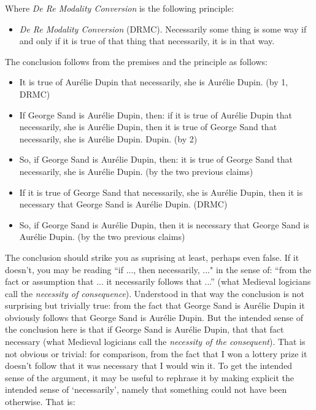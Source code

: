 \documentclass[../../../include/open-logic-chapter]{subfiles}
\begin{document}
Where \emph{De Re Modality Conversion} is the following principle:

\begin{itemize}
\item \emph{De Re Modality Conversion} (DRMC). Necessarily some thing is some way if and
only if it is true of that thing that necessarily, it is in that way. 
\end{itemize}

The conclusion follows from the premises and the principle as follows:

\begin{itemize}
\item It is true of Aurélie Dupin that necessarily, she is Aurélie
Dupin. (by 1, DRMC)
\item If George Sand is Aurélie Dupin, then: if it is true of Aurélie 
Dupin that necessarily, she is Aurélie Dupin, then it is true of 
George Sand that necessarily, she is Aurélie Dupin.
Dupin. (by 2)
\item So, if George Sand is Aurélie Dupin, then: it is true of George Sand that necessarily, she is Aurélie Dupin. (by the two previous claims)
\item If it is true of George Sand that necessarily, she is Aurélie Dupin, then it is necessary that George Sand is Aurélie Dupin. (DRMC)
\item So, if George Sand is Aurélie Dupin, then it is necessary that George Sand is Aurélie Dupin. (by the two previous claims)
\end{itemize}

The conclusion should strike you as suprising at least, perhaps even
false. If it doesn't, you may be reading ``if ..., then necessarily,
..." in the sense of: ``from the fact or assumption that ... it
necessarily follows that ...'' (what Medieval logicians call the
\emph{necessity of consequence}). Understood in that way the
conclusion is not surprising but trivially true: from the fact that
George Sand is Aurélie Dupin it obviously follows that George Sand is
Aurélie Dupin. But the intended sense of the conclusion here is that
if George Sand is Aurélie Dupin, that that fact necessary (what
Medieval logicians call the \emph{necessity of the consequent}). That
is not obvious or trivial: for comparison, from the fact that I won a
lottery prize it doesn't follow that it was necessary that I would win
it. To get the intended sense of the argument, it may be useful to
rephrase it by making explicit the intended sense of `necessarily',
namely that something could not have been otherwise. That is:
\end{document}
